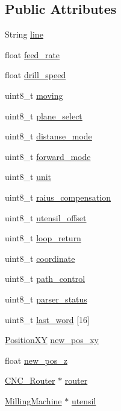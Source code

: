 \subsection*{Public Attributes}
\begin{DoxyCompactItemize}
\item 
String \hyperlink{class_g_code_a20d7c90740e9e139b24f68336ad8c8f1}{line}
\item 
float \hyperlink{class_g_code_a0115efce11fdffa2c59304706ecacede}{feed\+\_\+rate}
\item 
float \hyperlink{class_g_code_a2fc16db9dc5dbe95abc8b9b2a5ab6f5c}{drill\+\_\+speed}
\item 
uint8\+\_\+t \hyperlink{class_g_code_ae84ec0e15b18d91420c39627d1bdf78a}{moving}
\item 
uint8\+\_\+t \hyperlink{class_g_code_a0f278ed4c1265656f062365ca345d353}{plane\+\_\+select}
\item 
uint8\+\_\+t \hyperlink{class_g_code_a77dad1d8057ecc38242757923a2bb87f}{distanse\+\_\+mode}
\item 
uint8\+\_\+t \hyperlink{class_g_code_acbf5f3b9aeffe27d3f87e9d57b487146}{forward\+\_\+mode}
\item 
uint8\+\_\+t \hyperlink{class_g_code_a76a406426d6a80e3c08b0ecd09db3ffd}{unit}
\item 
uint8\+\_\+t \hyperlink{class_g_code_a300348c946bb94260576136ffb7e0fa0}{raius\+\_\+compensation}
\item 
uint8\+\_\+t \hyperlink{class_g_code_a33ac8c517b978b71a6af37c362dc3edb}{utensil\+\_\+offset}
\item 
uint8\+\_\+t \hyperlink{class_g_code_a600deaa28b54bd8fca4d8eb51fb09b55}{loop\+\_\+return}
\item 
uint8\+\_\+t \hyperlink{class_g_code_a4311a77cb2efcc0bce0c582ae80755e1}{coordinate}
\item 
uint8\+\_\+t \hyperlink{class_g_code_a05307dd7b9ff2f74bfd81aed40104fa8}{path\+\_\+control}
\item 
uint8\+\_\+t \hyperlink{class_g_code_a56d0e5e56115cd8e7b3f161cc8c0528e}{parser\+\_\+status}
\item 
uint8\+\_\+t \hyperlink{class_g_code_a3674417ee3c5141c6655c05f6ffa0799}{last\+\_\+word} \mbox{[}16\mbox{]}
\item 
\hyperlink{class_position_x_y}{Position\+X\+Y} \hyperlink{class_g_code_a996f87623f8a0263c3a7761060330de0}{new\+\_\+pos\+\_\+xy}
\item 
float \hyperlink{class_g_code_acd3b6b2ecfc46bff229fbfd7ba72930f}{new\+\_\+pos\+\_\+z}
\item 
\hyperlink{class_c_n_c___router}{C\+N\+C\+\_\+\+Router} $\ast$ \hyperlink{class_g_code_ab060bb5bd169ae7640eb781bef6b78fe}{router}
\item 
\hyperlink{class_milling_machine}{Milling\+Machine} $\ast$ \hyperlink{class_g_code_a9a737c33f133cf515926d0f2b612bd22}{utensil}
\end{DoxyCompactItemize}


